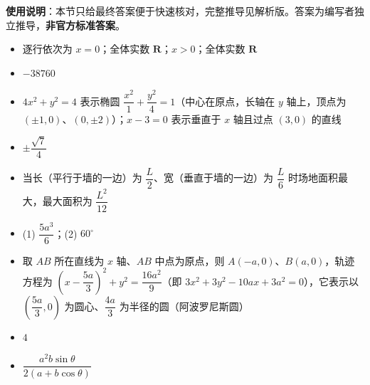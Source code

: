 
\begin{gknotice}
\textbf{使用说明}：本节只给最终答案便于快速核对，完整推导见解析版。答案为编写者独立推导，\textbf{非官方标准答案}。
\end{gknotice}

\begin{itemize}[leftmargin=2.6em]
  \item[\textbf{1.}] 逐行依次为 $x=0$；全体实数 $\mathbf{R}$；$x>0$；全体实数 $\mathbf{R}$
  \item[\textbf{2.}] $-38760$
  \item[\textbf{3.}] $4x^2+y^2=4$ 表示椭圆 $\dfrac{x^2}{1}+\dfrac{y^2}{4}=1$（中心在原点，长轴在 $y$ 轴上，顶点为 $(\pm1,0)$、$(0,\pm2)$）；$x-3=0$ 表示垂直于 $x$ 轴且过点 $(3,0)$ 的直线
  \item[\textbf{4.}] $\pm\dfrac{\sqrt7}{4}$
  \item[\textbf{5.}] 当长（平行于墙的一边）为 $\dfrac L2$、宽（垂直于墙的一边）为 $\dfrac L6$ 时场地面积最大，最大面积为 $\dfrac{L^2}{12}$
  \item[\textbf{6.}] (1) $\dfrac{5a^3}{6}$；(2) $60^\circ$
  \item[\textbf{7.}] 取 $AB$ 所在直线为 $x$ 轴、$AB$ 中点为原点，则 $A(-a,0)$、$B(a,0)$，轨迹方程为 $\left(x-\dfrac{5a}{3}\right)^2+y^2=\dfrac{16a^2}{9}$（即 $3x^2+3y^2-10ax+3a^2=0$），它表示以 $\left(\dfrac{5a}{3},0\right)$ 为圆心、$\dfrac{4a}{3}$ 为半径的圆（阿波罗尼斯圆）
  \item[\textbf{8.}] $4$
  \item[\textbf{9.}] $\dfrac{a^2b\sin\theta}{2(a+b\cos\theta)}$
\end{itemize}
